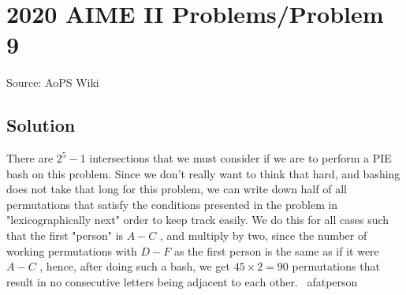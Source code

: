 \documentclass[12pt]{article}
\begin{document}
\section*{{2020 AIME II Problems/Problem 9}}
Source: AoPS Wiki

\subsection*{Solution}
There are $2^{5}-1$ intersections that we must consider if we are to perform a PIE bash on this problem. Since we don't really want to think that hard, and bashing does not take that long for this problem, we can write down half of all permutations that satisfy the conditions presented in the problem in "lexicographically next" order to keep track easily. We do this for all cases such that the first "person" is $A-C$ , and multiply by two, since the number of working permutations with $D-F$ as the first person is the same as if it were $A-C$ , hence, after doing such a bash, we get $45\times2=90$ permutations that result in no consecutive letters being adjacent to each other.
~afatperson
\end{document}
